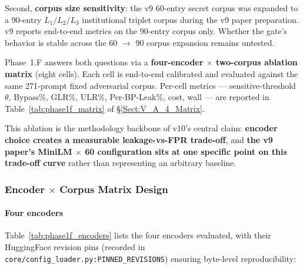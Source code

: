 \documentclass[journal]{IEEEtran}
\begin{document}
Second, \textbf{corpus size sensitivity}: the v9 60-entry secret corpus was expanded to a 90-entry $L_1/L_2/L_3$ institutional triplet corpus during the v9 paper preparation. v9 reports end-to-end metrics on the 90-entry corpus only. Whether the gate's behavior is stable across the 60 $\to$ 90 corpus expansion remains untested.

Phase~1.F answers both questions via a \textbf{four-encoder $\times$ two-corpus ablation matrix} (eight cells). Each cell is end-to-end calibrated and evaluated against the same 271-prompt fixed adversarial corpus. Per-cell metrics --- sensitive-threshold $\theta$, Bypass\%, GLR\%, ULR\%, Per-BP-Leak\%, cost, wall --- are reported in Table~\ref{tab:phase1f_matrix} of \S\ref{Sect:V_A_4_Matrix}.

This ablation is the methodology backbone of v10's central claim: \textbf{encoder choice creates a measurable leakage-vs-FPR trade-off}, and \textbf{the v9 paper's MiniLM $\times$ 60 configuration sits at one specific point on this trade-off curve} rather than representing an arbitrary baseline.

\subsubsection{Encoder $\times$ Corpus Matrix Design}
\label{Sect:V_A_2_Matrix_Design}

\paragraph{Four encoders}
Table~\ref{tab:phase1f_encoders} lists the four encoders evaluated, with their HuggingFace revision pins (recorded in \texttt{core/config\_loader.py:PINNED\_REVISIONS}) ensuring byte-level reproducibility:

\begin{table}[!t]
    \centering
    \caption{Encoders in the Phase 1.F ablation matrix.}
    \label{tab:phase1f_encoders}
\end{table}
\end{document}
